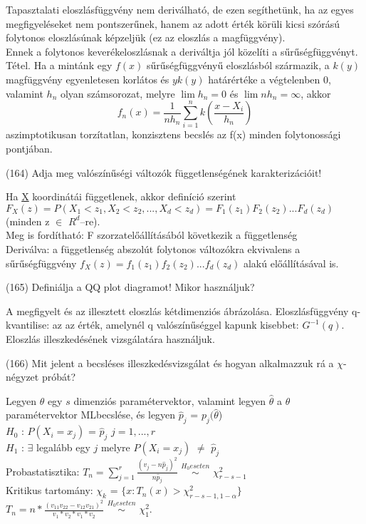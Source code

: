 \documentclass[12p]{article}
\begin{document}
Tapasztalati eloszlásfüggvény nem deriválható, de ezen segíthetünk, ha az egyes megfigyeléseket nem pontszerűnek, hanem az adott érték körüli kicsi szórású folytonos eloszlásúnak képzeljük (ez az eloszlás a magfüggvény).\\
Ennek a folytonos keverékeloszlásnak a deriváltja jól közelíti a sűrűségfüggvényt.\\
Tétel. Ha a mintánk egy $f(x)$ sűrűségfüggvényű
eloszlásból származik, a $k(y)$ magfüggvény
egyenletesen korlátos és $yk(y)$ határértéke a
végtelenben 0, valamint $h_n$ olyan számsorozat,
melyre $\lim h_n = 0$ és $\lim nh_n = \infty$, akkor
$$f_n(x) = \frac{1}{nh_n} \sum^{n}_{i=1}k\left(\frac{x-X_i}{h_n}\right)$$ 
aszimptotikusan torzítatlan, konzisztens becslés az f(x) minden folytonossági pontjában.

(164) Adja meg valószínűségi változók függetlenségének karakterizációit!

Ha \underline{X} koordinátái függetlenek, akkor definíció szerint\\
$F_X(z)=P(X_1<z_1, X_2< z_2,..., X_d<z_d)=F_1(z_1)F_2(z_2)...F_d(z_d)$ (minden z $\in$ $R^d$–re).\\
Meg is fordítható: F szorzatelőállításából következik a függetlenség\\
Deriválva: a függetlenség abszolút folytonos változókra ekvivalens a sűrűségfüggvény 
$f_X(z)=f_1(z_1)f_2(z_2)...f_d(z_d)$ alakú előállításával is.

(165) Definiálja a QQ plot diagramot! Mikor használjuk?

A megfigyelt és az illesztett eloszlás kétdimenziós ábrázolása. Eloszlásfüggvény q-kvantilise: az az érték, amelynél q valószínűséggel kapunk kisebbet: $G^{-1}(q)$.\\
Eloszlás illeszkedésének vizsgálatára használjuk.

(166) Mit jelent a becsléses illeszkedésvizsgálat és hogyan alkalmazzuk rá a $\chi$-négyzet próbát?

Legyen $\theta$ egy $s$ dimenziós paramétervektor, valamint legyen $\hat{\theta}$ a $\theta$ paramétervektor MLbecslése, és legyen $\hat{p}_j$ = $p_j (\hat{\theta}$)\\
$H_0$ : $P(X_i = x_j)$ = $\hat{p}_j$ $j = 1,. . . , r$\\
$H_1$ : $\exists$ legalább egy $j$ melyre $P(X_i = x_j)$ $\neq$ $\hat{p}_j$\\
Probastatisztika: $T_n = \displaystyle{\sum_{j=1}^{r}}\frac{(v_j - n\hat{p}_j)^2}{n\hat{p}_j}$ $\stackrel{H_0 eseten}{\sim}$ $\chi^2_{r-s-1}$\\
Kritikus tartomány: $\chi_k$ = $\{x: T_n(x) > \chi^2_{r-s-1,1-\alpha}\}$\\
$T_n = n * \frac{(v_{11}v_{22} - v_{12}v_{21})^2}{v_1 * v_2 * v_1 * v_2}$ $\stackrel{H_0 eseten}{\sim}$ $\chi^2_1$.
\end{document}
